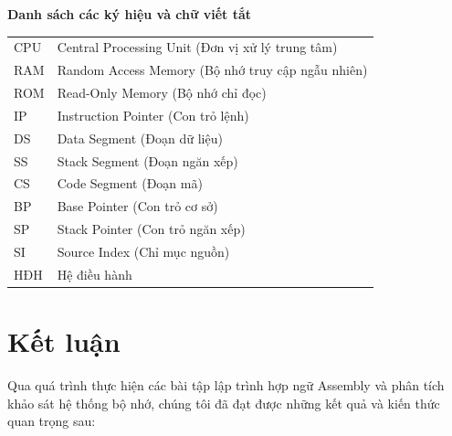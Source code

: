 \documentclass[12pt,a4paper,openany,oneside]{report}
\begin{document}
\restoregeometry
\pagestyle{fancy}
\fontsize{13pt}{13pt}\selectfont \baselineskip 0.75cm 

\newpage
\thispagestyle{empty}
\tableofcontents


\newpage 
{} 

\listoffigures


\newpage
\thispagestyle{plain}
\begin{center}
	{\LARGE
		{\bf Danh sách các ký hiệu và chữ viết tắt}}
\end{center}
\vspace{1.25cm}
{\fontsize{13}{13}\selectfont
	\begin{tabular}{ll}
		CPU & Central Processing Unit (Đơn vị xử lý trung tâm)\\
		RAM & Random Access Memory (Bộ nhớ truy cập ngẫu nhiên)\\
		ROM & Read-Only Memory (Bộ nhớ chỉ đọc)\\
		IP & Instruction Pointer (Con trỏ lệnh)\\
		DS & Data Segment (Đoạn dữ liệu)\\
		SS & Stack Segment (Đoạn ngăn xếp)\\
		CS & Code Segment (Đoạn mã)\\
		BP & Base Pointer (Con trỏ cơ sở)\\
		SP & Stack Pointer (Con trỏ ngăn xếp)\\
		SI & Source Index (Chỉ mục nguồn)\\
		HĐH & Hệ điều hành\\
	\end{tabular}
}

\newpage
{} 
\pagestyle{fancy} 









\chapter*{Kết luận}

Qua quá trình thực hiện các bài tập lập trình hợp ngữ Assembly và phân tích khảo sát hệ thống bộ nhớ, chúng tôi đã đạt được những kết quả và kiến thức quan trọng sau:
\end{document}
